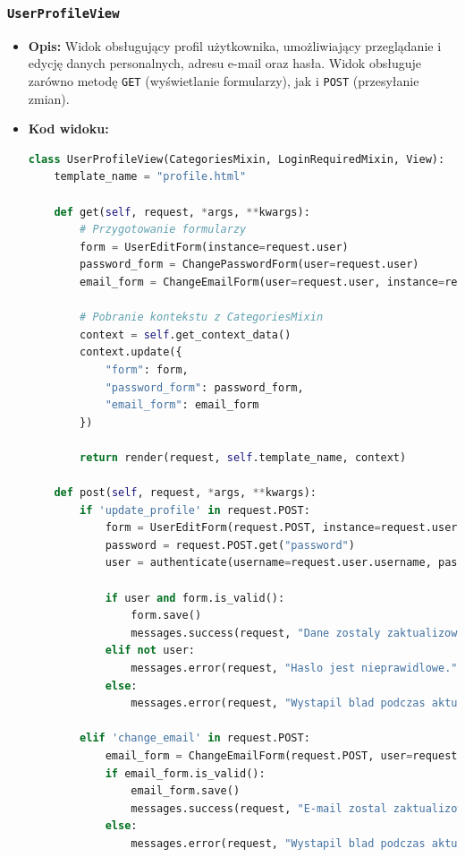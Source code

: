 \documentclass[12pt,a4paper,oneside]{article}
\theoremstyle{definition}
\numberwithin{equation}{section}
\begin{document}
\subsubsection*{\texttt{UserProfileView}}
    \begin{itemize}
        \item \textbf{Opis:} Widok obsługujący profil użytkownika, umożliwiający przeglądanie i edycję danych personalnych, adresu e-mail oraz hasła. Widok obsługuje zarówno metodę \texttt{GET} (wyświetlanie formularzy), jak i \texttt{POST} (przesyłanie zmian).
        \item \textbf{Kod widoku:}
    \begin{lstlisting}[language=Python, caption=UserProfileView]
class UserProfileView(CategoriesMixin, LoginRequiredMixin, View):
    template_name = "profile.html"

    def get(self, request, *args, **kwargs):
        # Przygotowanie formularzy
        form = UserEditForm(instance=request.user)
        password_form = ChangePasswordForm(user=request.user)
        email_form = ChangeEmailForm(user=request.user, instance=request.user)

        # Pobranie kontekstu z CategoriesMixin
        context = self.get_context_data()
        context.update({
            "form": form,
            "password_form": password_form,
            "email_form": email_form
        })

        return render(request, self.template_name, context)

    def post(self, request, *args, **kwargs):
        if 'update_profile' in request.POST:
            form = UserEditForm(request.POST, instance=request.user)
            password = request.POST.get("password")
            user = authenticate(username=request.user.username, password=password)

            if user and form.is_valid():
                form.save()
                messages.success(request, "Dane zostaly zaktualizowane.")
            elif not user:
                messages.error(request, "Haslo jest nieprawidlowe.")
            else:
                messages.error(request, "Wystapil blad podczas aktualizacji.")

        elif 'change_email' in request.POST:
            email_form = ChangeEmailForm(request.POST, user=request.user, instance=request.user)
            if email_form.is_valid():
                email_form.save()
                messages.success(request, "E-mail zostal zaktualizowany.")
            else:
                messages.error(request, "Wystapil blad podczas aktualizacji e-maila.")


\end{lstlisting}
\end{itemize}
\end{document}
